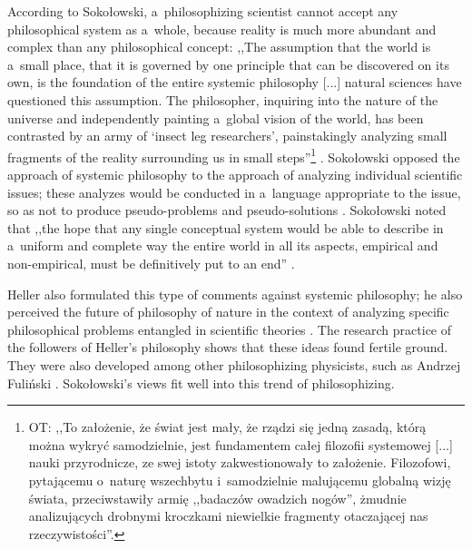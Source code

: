 \documentclass[%
  manuscript=article,
  year=2024,
  volume=77,
  doi=00000.000,
]{zfn}
\begin{document}
According to Sokołowski, a~philosophizing scientist cannot accept any philosophical system as a~whole, because reality is much more abundant and complex than any philosophical concept: ,,The assumption that the world is a~small place, that it is governed by one principle that can be discovered on its own, is the foundation of the entire systemic philosophy [...] natural sciences have questioned this assumption. The philosopher, inquiring into the nature of the universe and independently painting a~global vision of the world, has been contrasted by an army of ‘insect leg researchers', painstakingly analyzing small fragments of the reality surrounding us in small steps''\footnote{OT: ,,To założenie, że świat jest mały, że rządzi się jedną zasadą, którą można wykryć samodzielnie, jest fundamentem całej filozofii systemowej [...] nauki przyrodnicze, ze swej istoty zakwestionowały to założenie. Filozofowi, pytającemu o~naturę wszechbytu i~samodzielnie malującemu globalną wizję świata, przeciwstawiły armię ,,badaczów owadzich nogów'', żmudnie analizujących drobnymi kroczkami niewielkie fragmenty otaczającej nas rzeczywistości''.} 
\parencite[][p.45]{}. %
 Sokołowski opposed the approach of systemic philosophy to the approach of analyzing individual scientific issues; these analyzes would be conducted in a~language appropriate to the issue, so as not to produce pseudo-problems and pseudo-solutions 
\parencite[][p.207]{}. %
 Sokołowski noted that ,,the hope that any single conceptual system would be able to describe in a~uniform and complete way the entire world in all its aspects, empirical and non-empirical, must be definitively put to an end'' 
\parencite[][]{}.%




Heller also formulated this type of comments against systemic philosophy; he also perceived the future of philosophy of nature in the context of analyzing specific philosophical problems entangled in scientific theories 
\parencites[][]{Heller1986Jak}[][]{Heller1990Nowa}. %
 The research practice of the followers of Heller's philosophy shows that these ideas found fertile ground. They were also developed among other philosophizing physicists, such as Andrzej Fuliński 
\parencite[][]{Trombik2023Andrzej}. %
 Sokołowski's views fit well into this trend of philosophizing.
\end{document}
